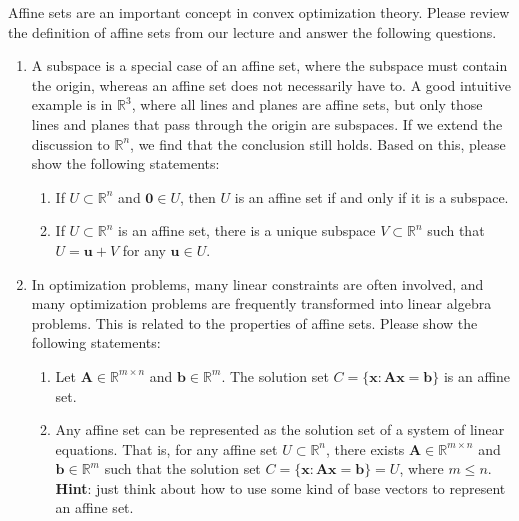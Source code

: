 \documentclass[11pt,letter,notitlepage]{article}
\begin{document}
\begin{exercise}
 Affine sets are an important concept in convex optimization theory. Please review the definition of affine sets from our lecture and answer the following questions.
\begin{enumerate}
    \item A subspace is a special case of an affine set, where the subspace must contain the origin, whereas an affine set does not necessarily have to. A good intuitive example is in $\mathbb{R}^3$, where all lines and planes are affine sets, but only those lines and planes that pass through the origin are subspaces. If we extend the discussion to $\mathbb{R}^n$, we find that the conclusion still holds. Based on this, please show the following statements:
    \begin{enumerate}
        \item If $U\subset\mathbb{R}^n$ and $\mathbf{0}\in U$, then $U$ is an affine set if and only if it is a subspace.
        \item If $U\subset\mathbb{R}^n$ is an affine set, there is a unique subspace $V\subset\mathbb{R}^n$ such that $U=\mathbf{u}+V$ for any $\mathbf{u} \in U$.
    \end{enumerate}
    
    \item In optimization problems, many linear constraints are often involved, and many optimization problems are frequently transformed into linear algebra problems. This is related to the properties of affine sets. Please show the following statements: 
    \begin{enumerate}
        \item Let $\mathbf{A}\in \mathbb{R}^{m\times n}$ and $\mathbf{b}\in\mathbb{R}^m$. The solution set $C=\{\mathbf{x}:\mathbf{Ax}=\mathbf{b}\}$ is an affine set.
        \item Any affine set can be represented as the solution set of a system of linear equations. That is, for any affine set $U \subset \mathbb{R}^n$, there exists $\mathbf{A} \in \mathbb{R}^{m \times n}$ and $\mathbf{b} \in \mathbb{R}^{m}$ such that the solution set $C=\{\mathbf{x}:\mathbf{Ax}=\mathbf{b}\} = U$, where $m \leq n$.\\
        \textbf{Hint}: just think about how to use some kind of base vectors to represent an affine set. 
    \end{enumerate}
    
\end{enumerate}
\end{exercise}
\begin{solution}

\end{solution}
\end{document}
